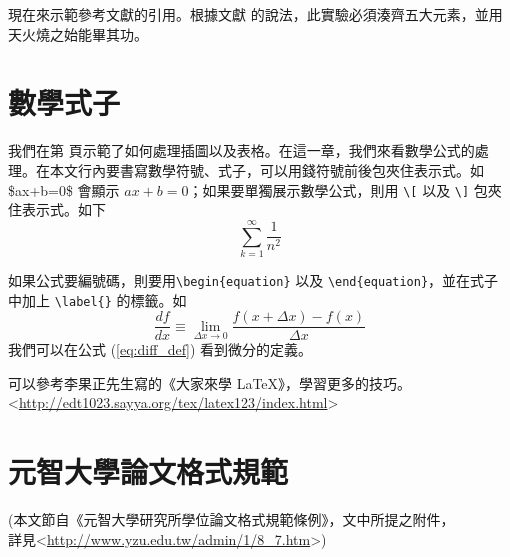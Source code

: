 現在來示範參考文獻的引用。根據文獻\cite{ieee_dmr_2_50_2002_chou} 的說法，此實驗必須湊齊五大元素\cite{jap_093_1108_2003_kondakov, ieee_ed_50_1830_2003_oriols, Chem.Mater._8_1365_1996_Papadimitrakopoulos, jap_079_2745_1996_scott, jap_087_8049_2000_adachi, jap_089_1704_2001_brutting, jap_089_4673_2001_popovic, synth.met._132_9_2002_nomura, cjk_book, thinfilm_macleod_2001}，並用天火燒之始能畢其功。


\chapter{數學式子}
我們在第 \pageref{ch:example} 頁示範了如何處理插圖以及表格。在這一章，我們來看數學公式的處理。在本文行內要書寫數學符號、式子，可以用錢符號前後包夾住表示式。如 \$ax+b=0\$ 會顯示 $ax+b=0$；如果要單獨展示數學公式，則用 \verb+\[+ 以及 \verb+\]+ 包夾住表示式。如下
\[
\sum_{k=1}^{\infty}\frac{1}{n^2}
\]

如果公式要編號碼，則要用\verb+\begin{equation}+ 以及 \verb+\end{equation}+，並在式子中加上 \verb+\label{}+ 的標籤。如
\begin{equation}
  \frac{df}{dx} \equiv \lim_{\Delta x \rightarrow 0} \frac{f(x+\Delta x) - f(x)}{\Delta x}   \label{eq:diff_def}
\end{equation}
我們可以在公式 (\ref{eq:diff_def}) 看到微分的定義。

可以參考李果正先生寫的《大家來學 {\LaTeX}》，學習更多的技巧。\\
\textless{}\url{http://edt1023.sayya.org/tex/latex123/index.html}\textgreater{}

\chapter{元智大學論文格式規範}
(本文節自《元智大學研究所學位論文格式規範條例》，文中所提之附件，\\
詳見\textless{}\url{http://www.yzu.edu.tw/admin/1/8_7.htm}\textgreater{})

